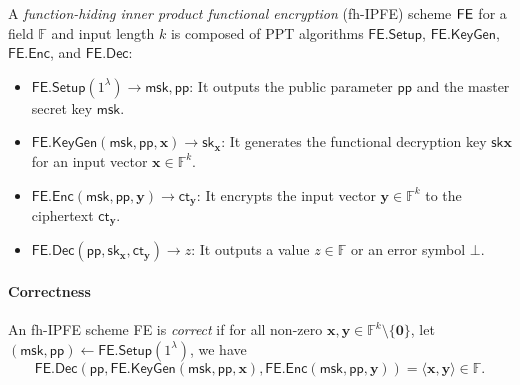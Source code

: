 


\begin{definition}
\label{def:fh-IPFE}
	A \emph{function-hiding inner product functional encryption} (fh-IPFE) scheme $\sf FE$ for a field $\mathbb{F}$ and input length $k$ is composed of PPT algorithms $\textsf{FE.Setup}$, $\textsf{FE.KeyGen}$, $\textsf{FE.Enc}$, and $\textsf{FE.Dec}$:

	\begin{itemize}
	
		\item $\textsf{FE.Setup}(1^\lambda) \to \textsf{msk}, \textsf{pp}$: It outputs the public parameter $\textsf{pp}$ and the master secret key $\textsf{msk}$.
	
		\item $\textsf{FE.KeyGen}(\textsf{msk}, \textsf{pp}, \mathbf{x}) \to \textsf{sk}_{\mathbf{x}}$: It generates the functional decryption key $\textsf{sk}{\mathbf{x}}$ for an input vector $\mathbf{x} \in \mathbb{F}^k$. 
	
		\item $\textsf{FE.Enc}(\textsf{msk}, \textsf{pp}, \mathbf{y}) \to \textsf{ct}_{\mathbf{y}}$: It encrypts the input vector $\mathbf{y} \in \mathbb{F}^k$ to the ciphertext $\textsf{ct}_{\mathbf{y}}$. 
	
		\item $\textsf{FE.Dec}(\textsf{pp}, \textsf{sk}_{\mathbf{x}}, \textsf{ct}_{\mathbf{y}}) \to z$: It outputs a value $z \in \mathbb{F}$ or an error symbol $\bot$.
	
	\end{itemize}
	
	\paragraph{\textbf{Correctness}} An fh-IPFE scheme \textsf{FE} is \emph{correct} if for all non-zero $ \mathbf{x}, \mathbf{y} \in \mathbb{F}^k \setminus \{\mathbf{0}\}$, let $(\textsf{msk}, \textsf{pp}) \gets \textsf{FE.Setup}(1^\lambda)$, we have
	\[
		\textsf{FE.Dec}( \textsf{pp}, \textsf{FE.KeyGen}(\textsf{msk}, \textsf{pp}, \mathbf{x}), \textsf{FE.Enc}(\textsf{msk}, \textsf{pp}, \mathbf{y}) ) = \langle \mathbf{x}, \mathbf{y} \rangle \in \mathbb{F}.
	\]

\end{definition}

